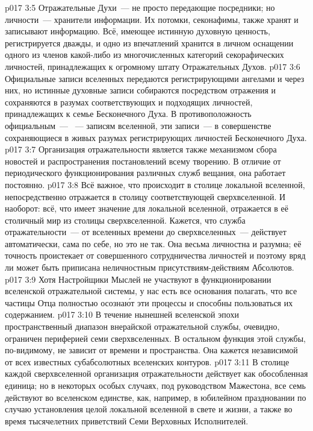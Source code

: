 \vs p017 3:5 \pc Отражательные Духи~--- не просто передающие посредники; но личности~--- хранители информации. Их потомки, секонафимы, также хранят и записывают информацию. Всё, имеющее истинную духовную ценность, регистрируется дважды, и одно из впечатлений хранится в личном оснащении одного из членов какой\hyp{}либо из многочисленных категорий секорафических личностей, принадлежащих к огромному штату Отражательных Духов.
\vs p017 3:6 Официальные записи вселенных передаются регистрирующими ангелами и через них, но истинные духовные записи собираются посредством отражения и сохраняются в разумах соответствующих и подходящих личностей, принадлежащих к семье Бесконечного Духа. В противоположность официальным~--- ~--- записям вселенной, эти записи~---  в совершенстве сохраняющиеся в живых разумах регистрирующих личностей Бесконечного Духа.
\vs p017 3:7 Организация отражательности является также механизмом сбора новостей и распространения постановлений всему творению. В отличие от периодического функционирования различных служб вещания, она работает постоянно.
\vs p017 3:8 Всё важное, что происходит в столице локальной вселенной, непосредственно отражается в столицу соответствующей сверхвселенной. И наоборот: всё, что имеет значение для локальной вселенной, отражается в её столичный мир из столицы сверхвселенной. Кажется, что служба отражательности~--- от вселенных времени до сверхвселенных~--- действует автоматически, сама по себе, но это не так. Она весьма личностна и разумна; её точность проистекает от совершенного сотрудничества личностей и поэтому вряд ли может быть приписана неличностным присутствиям\hyp{}действиям Абсолютов.
\vs p017 3:9 Хотя Настройщики Мыслей не участвуют в функционировании вселенской отражательной системы, у нас есть все основания полагать, что все частицы Отца полностью осозна\'ют эти процессы и способны пользоваться их содержанием.
\vs p017 3:10 \pc В течение нынешней вселенской эпохи пространственный диапазон внерайской отражательной службы, очевидно, ограничен периферией семи сверхвселенных. В остальном функция этой службы, по\hyp{}видимому, не зависит от времени и пространства. Она кажется независимой от всех известных субабсолютных вселенских контуров.
\vs p017 3:11 В столице каждой сверхвселенной организация отражательности действует как обособленная единица; но в некоторых особых случаях, под руководством Мажестона, все семь действуют во вселенском единстве, как, например, в юбилейном праздновании по случаю установления целой локальной вселенной в свете и жизни, а также во время тысячелетних приветствий Семи Верховных Исполнителей.
